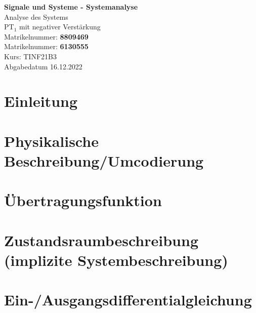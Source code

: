 \documentclass[
  ngerman
  ,12pt
  ,pdftex
]{article}
\begin{document}
\begin{titlepage}
  \begin{center}
      {\Huge \textbf{Signale und Systeme - Systemanalyse}}\\[1.5cm]
      {\Large Analyse des Systems}\\[1cm]
      {\Huge PT$_{1}$ mit negativer Verstärkung}\\[7cm]
      {\large Matrikelnummer: \textbf{8809469}}\\[0.5cm]
      {\large Matrikelnummer: \textbf{6130555}}\\[0.5cm]
      {\large Kurs: TINF21B3}\\[0.5cm]
      {\large Abgabedatum 16.12.2022}
      \vfill
  \end{center}
\end{titlepage}
\newpage
\tableofcontents
\newpage



\section{Einleitung}    %


% 

\section{Physikalische Beschreibung/Umcodierung}    %


\section{Übertragungsfunktion}    %


\section{Zustandsraumbeschreibung (implizite Systembeschreibung)}   %


\section{Ein-/Ausgangsdifferentialgleichung}    %

\end{document}
